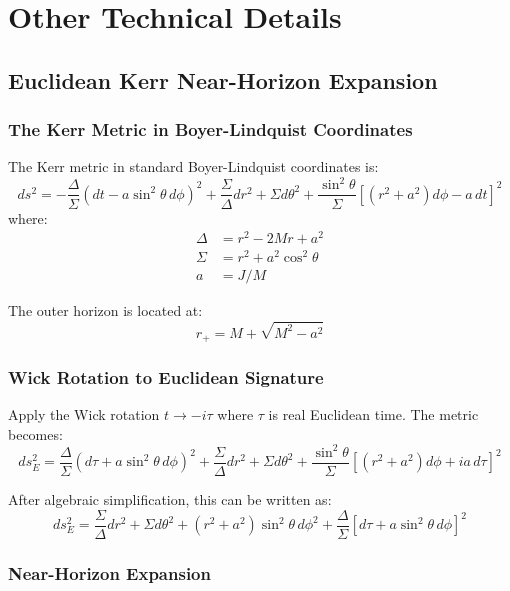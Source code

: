 \documentclass[11pt]{article}
\begin{document}
\section{ Other Technical Details}
\subsection{Euclidean Kerr Near-Horizon Expansion}

\subsubsection{The Kerr Metric in Boyer-Lindquist Coordinates}

The Kerr metric in standard Boyer-Lindquist coordinates is:
\begin{equation}
ds^2 = -\frac{\Delta}{\Sigma}(dt - a\sin^2\theta\, d\phi)^2 + \frac{\Sigma}{\Delta}dr^2 + \Sigma d\theta^2 + \frac{\sin^2\theta}{\Sigma}[(r^2+a^2)d\phi - a\,dt]^2
\end{equation}
where:
\begin{align}
\Delta &= r^2 - 2Mr + a^2 \\
\Sigma &= r^2 + a^2\cos^2\theta \\
a &= J/M
\end{align}

The outer horizon is located at:
\begin{equation}
r_+ = M + \sqrt{M^2 - a^2}
\end{equation}

\subsubsection{Wick Rotation to Euclidean Signature}

Apply the Wick rotation $t \to -i\tau$ where $\tau$ is real Euclidean time. The metric becomes:
\begin{equation}
ds^2_E = \frac{\Delta}{\Sigma}(d\tau + a\sin^2\theta\, d\phi)^2 + \frac{\Sigma}{\Delta}dr^2 + \Sigma d\theta^2 + \frac{\sin^2\theta}{\Sigma}[(r^2+a^2)d\phi + ia\,d\tau]^2
\end{equation}

After algebraic simplification, this can be written as:
\begin{equation}
ds^2_E = \frac{\Sigma}{\Delta}dr^2 + \Sigma d\theta^2 + (r^2+a^2)\sin^2\theta\, d\phi^2 + \frac{\Delta}{\Sigma}[d\tau + a\sin^2\theta\, d\phi]^2
\end{equation}

\subsubsection{Near-Horizon Expansion}
\end{document}
